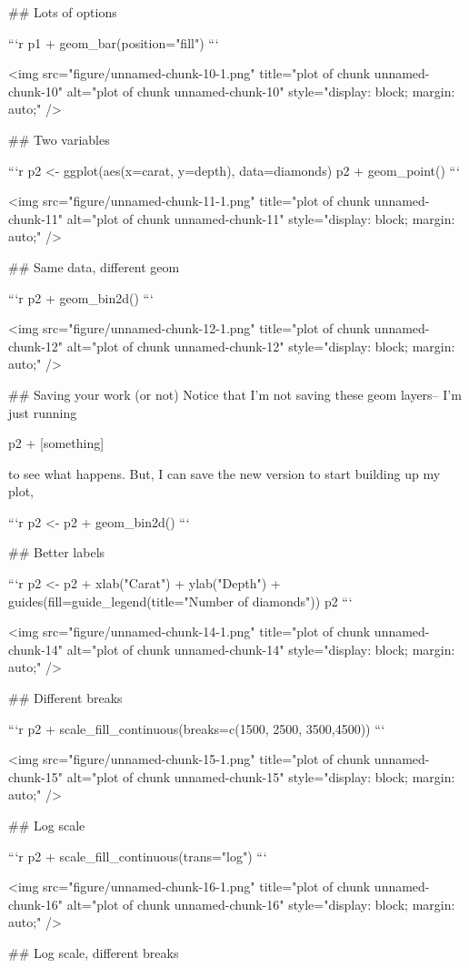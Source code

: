 ## Lots of options

```r
p1 + geom_bar(position="fill")
```

<img src="figure/unnamed-chunk-10-1.png" title="plot of chunk unnamed-chunk-10" alt="plot of chunk unnamed-chunk-10" style="display: block; margin: auto;" />


## Two variables

```r
p2 <- ggplot(aes(x=carat, y=depth), data=diamonds)
p2 + geom_point()
```

<img src="figure/unnamed-chunk-11-1.png" title="plot of chunk unnamed-chunk-11" alt="plot of chunk unnamed-chunk-11" style="display: block; margin: auto;" />

## Same data, different geom

```r
p2 + geom_bin2d()
```

<img src="figure/unnamed-chunk-12-1.png" title="plot of chunk unnamed-chunk-12" alt="plot of chunk unnamed-chunk-12" style="display: block; margin: auto;" />

## Saving your work (or not)
Notice that I'm not saving these geom layers-- I'm just running 

p2 + [something] 

to see what happens. But, I can save the new version to start building up my plot,

```r
p2 <- p2 + geom_bin2d()
```

## Better labels

```r
p2 <- p2 + xlab("Carat") + ylab("Depth") + 
 guides(fill=guide_legend(title="Number of diamonds"))
p2
```

<img src="figure/unnamed-chunk-14-1.png" title="plot of chunk unnamed-chunk-14" alt="plot of chunk unnamed-chunk-14" style="display: block; margin: auto;" />

## Different breaks

```r
p2 + scale_fill_continuous(breaks=c(1500, 2500, 3500,4500))
```

<img src="figure/unnamed-chunk-15-1.png" title="plot of chunk unnamed-chunk-15" alt="plot of chunk unnamed-chunk-15" style="display: block; margin: auto;" />

## Log scale

```r
p2 + scale_fill_continuous(trans="log")
```

<img src="figure/unnamed-chunk-16-1.png" title="plot of chunk unnamed-chunk-16" alt="plot of chunk unnamed-chunk-16" style="display: block; margin: auto;" />

## Log scale, different breaks

